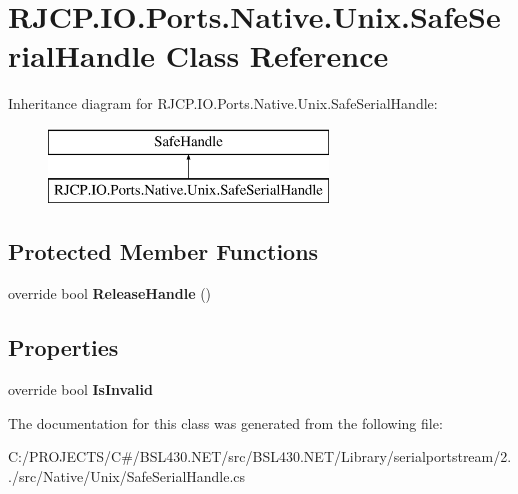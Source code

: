 \hypertarget{class_r_j_c_p_1_1_i_o_1_1_ports_1_1_native_1_1_unix_1_1_safe_serial_handle}{}\section{R\+J\+C\+P.\+I\+O.\+Ports.\+Native.\+Unix.\+Safe\+Serial\+Handle Class Reference}
\label{class_r_j_c_p_1_1_i_o_1_1_ports_1_1_native_1_1_unix_1_1_safe_serial_handle}
Inheritance diagram for R\+J\+C\+P.\+I\+O.\+Ports.\+Native.\+Unix.\+Safe\+Serial\+Handle\+:\begin{figure}[H]
\begin{center}
\leavevmode
\includegraphics[height=2.000000cm]{class_r_j_c_p_1_1_i_o_1_1_ports_1_1_native_1_1_unix_1_1_safe_serial_handle}
\end{center}
\end{figure}
\subsection*{Protected Member Functions}
\begin{DoxyCompactItemize}
\item 
\mbox{\label{class_r_j_c_p_1_1_i_o_1_1_ports_1_1_native_1_1_unix_1_1_safe_serial_handle_a92721e127582e44265ebe27e217a2df9}} 
override bool {\bfseries Release\+Handle} ()
\end{DoxyCompactItemize}
\subsection*{Properties}
\begin{DoxyCompactItemize}
\item 
\mbox{\label{class_r_j_c_p_1_1_i_o_1_1_ports_1_1_native_1_1_unix_1_1_safe_serial_handle_a9b4f1a655ae2a699f3bd3655084f655f}} 
override bool {\bfseries Is\+Invalid}
\end{DoxyCompactItemize}


The documentation for this class was generated from the following file\+:\begin{DoxyCompactItemize}
\item 
C\+:/\+P\+R\+O\+J\+E\+C\+T\+S/\+C\#/\+B\+S\+L430.\+N\+E\+T/src/\+B\+S\+L430.\+N\+E\+T/\+Library/serialportstream/2../src/\+Native/\+Unix/Safe\+Serial\+Handle.\+cs\end{DoxyCompactItemize}
